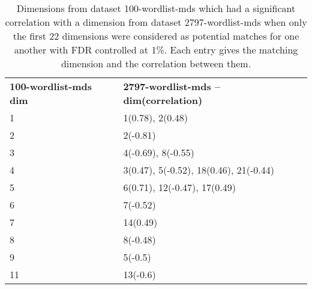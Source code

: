 \begin{table}[!tbp]
    \begin{tabular}{| ll |}
        \hline
        \textbf{100-wordlist-mds dim} & \textbf{2797-wordlist-mds -- dim(correlation)}\\
        1 & 1(0.78), 2(0.48)\\
        2 & 2(-0.81)\\
        3 & 4(-0.69), 8(-0.55)\\
        4 & 3(0.47), 5(-0.52), 18(0.46), 21(-0.44)\\
        5 & 6(0.71), 12(-0.47), 17(0.49)\\
        6 & 7(-0.52)\\
        7 & 14(0.49)\\
        8 & 8(-0.48)\\
        9 & 5(-0.5)\\
        11 & 13(-0.6)\\
        \hline
    \end{tabular}
    \caption{Dimensions from dataset 100-wordlist-mds which had a significant correlation with a dimension from dataset 2797-wordlist-mds when only the first 22 dimensions were considered as potential matches for one another with FDR controlled at 1\%. Each entry gives the matching dimension and the correlation between them.}
    \label{100-vs-2797-from-800dim-lowercase-wmt-model-significant-first-22.tex}
\end{table}
